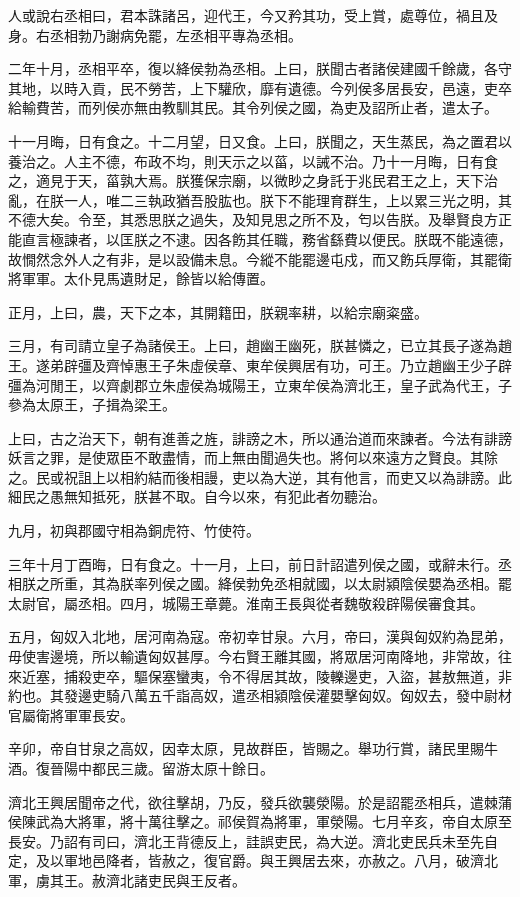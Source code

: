 人或說右丞相曰，君本誅諸呂，迎代王，今又矜其功，受上賞，處尊位，禍且及身。右丞相勃乃謝病免罷，左丞相平專為丞相。

二年十月，丞相平卒，復以絳侯勃為丞相。上曰，朕聞古者諸侯建國千餘歲，各守其地，以時入貢，民不勞苦，上下驩欣，靡有遺德。今列侯多居長安，邑遠，吏卒給輸費苦，而列侯亦無由教馴其民。其令列侯之國，為吏及詔所止者，遣太子。

十一月晦，日有食之。十二月望，日又食。上曰，朕聞之，天生蒸民，為之置君以養治之。人主不德，布政不均，則天示之以菑，以誡不治。乃十一月晦，日有食之，適見于天，菑孰大焉。朕獲保宗廟，以微眇之身託于兆民君王之上，天下治亂，在朕一人，唯二三執政猶吾股肱也。朕下不能理育群生，上以累三光之明，其不德大矣。令至，其悉思朕之過失，及知見思之所不及，匄以告朕。及舉賢良方正能直言極諫者，以匡朕之不逮。因各飭其任職，務省繇費以便民。朕既不能遠德，故憪然念外人之有非，是以設備未息。今縱不能罷邊屯戍，而又飭兵厚衛，其罷衛將軍軍。太仆見馬遺財足，餘皆以給傳置。

正月，上曰，農，天下之本，其開籍田，朕親率耕，以給宗廟粢盛。

三月，有司請立皇子為諸侯王。上曰，趙幽王幽死，朕甚憐之，已立其長子遂為趙王。遂弟辟彊及齊悼惠王子朱虛侯章、東牟侯興居有功，可王。乃立趙幽王少子辟彊為河閒王，以齊劇郡立朱虛侯為城陽王，立東牟侯為濟北王，皇子武為代王，子參為太原王，子揖為梁王。

上曰，古之治天下，朝有進善之旌，誹謗之木，所以通治道而來諫者。今法有誹謗妖言之罪，是使眾臣不敢盡情，而上無由聞過失也。將何以來遠方之賢良。其除之。民或祝詛上以相約結而後相謾，吏以為大逆，其有他言，而吏又以為誹謗。此細民之愚無知抵死，朕甚不取。自今以來，有犯此者勿聽治。

九月，初與郡國守相為銅虎符、竹使符。

三年十月丁酉晦，日有食之。十一月，上曰，前日計詔遣列侯之國，或辭未行。丞相朕之所重，其為朕率列侯之國。絳侯勃免丞相就國，以太尉潁陰侯嬰為丞相。罷太尉官，屬丞相。四月，城陽王章薨。淮南王長與從者魏敬殺辟陽侯審食其。

五月，匈奴入北地，居河南為寇。帝初幸甘泉。六月，帝曰，漢與匈奴約為昆弟，毋使害邊境，所以輸遺匈奴甚厚。今右賢王離其國，將眾居河南降地，非常故，往來近塞，捕殺吏卒，驅保塞蠻夷，令不得居其故，陵轢邊吏，入盜，甚敖無道，非約也。其發邊吏騎八萬五千詣高奴，遣丞相潁陰侯灌嬰擊匈奴。匈奴去，發中尉材官屬衛將軍軍長安。

辛卯，帝自甘泉之高奴，因幸太原，見故群臣，皆賜之。舉功行賞，諸民里賜牛酒。復晉陽中都民三歲。留游太原十餘日。

濟北王興居聞帝之代，欲往擊胡，乃反，發兵欲襲滎陽。於是詔罷丞相兵，遣棘蒲侯陳武為大將軍，將十萬往擊之。祁侯賀為將軍，軍滎陽。七月辛亥，帝自太原至長安。乃詔有司曰，濟北王背德反上，詿誤吏民，為大逆。濟北吏民兵未至先自定，及以軍地邑降者，皆赦之，復官爵。與王興居去來，亦赦之。八月，破濟北軍，虜其王。赦濟北諸吏民與王反者。

